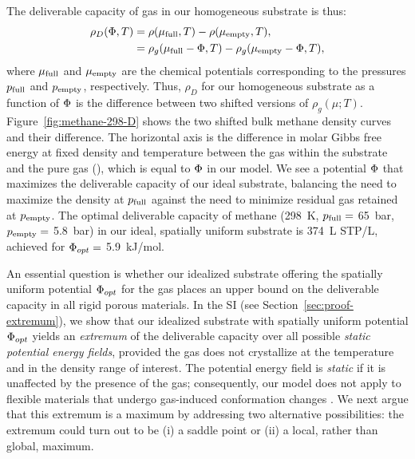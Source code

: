 The deliverable capacity of gas in our homogeneous substrate is thus:
\begin{align}
    \rho_D(\Phi,T) &= \rho(\mu_{\text{full}},T) - \rho(\mu_{\text{empty}},T),
    \label{eq:DofPhi}
    \\
    &= \rho_g(\mu_{\text{full}}-\Phi,T) - \rho_g(\mu_{\text{empty}}-\Phi,T),
\end{align}
where $\mu_{\text{full}}$ and $\mu_{\text{empty}}$ are the chemical potentials corresponding to the pressures $p_{\text{full}}$ and $p_{\text{empty}}$, respectively.
Thus, $\rho_D$ for our homogeneous substrate as a function of $\Phi$ is the difference between two shifted versions of $\rho_g(\mu; T)$.
Figure~\ref{fig:methane-298-D} shows the two shifted bulk methane density curves and their difference.
The horizontal axis
is the difference in molar Gibbs free energy at fixed density and temperature between the gas within the substrate and the pure gas (\gst), which is equal to $\Phi$ in our model.
We see a potential $\Phi$ that maximizes the deliverable capacity of our ideal substrate, balancing the need to maximize the density at $p_{\text{full}}$ against the need to minimize residual gas retained at $p_{\text{empty}}$. 
The optimal deliverable capacity of methane (298\ K, $p_{\text{full}}=$ 65\ bar, $p_{\text{empty}}=$ 5.8\ bar) in our ideal, spatially uniform substrate is 374\ L STP/L, achieved for $\Phi_{opt} =$ 5.9\ kJ/mol.
%

An essential question is whether our idealized substrate offering the spatially uniform potential $\Phi_{opt}$ for the gas places an upper bound on the deliverable capacity in all rigid porous materials. 
In the SI (see Section~\ref{sec:proof-extremum}), we show that our idealized substrate with spatially uniform potential $\Phi_{opt}$ yields an \emph{extremum} of the deliverable capacity over all possible \emph{static potential energy fields}, provided the gas does not crystallize at the temperature and in the density range of interest. The potential energy field is \emph{static} if it is unaffected by the presence of the gas; consequently, our model does not apply to flexible materials that undergo gas-induced conformation changes \cite{schneemann2014flexible}. We next argue that this extremum is a maximum by addressing two alternative possibilities: the extremum could turn out to be (i) a saddle point or (ii) a local, rather than global, maximum.

